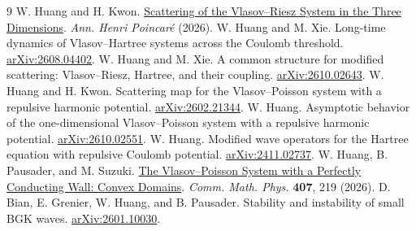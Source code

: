 \documentclass[reqno,10pt,letterpaper]{amsart}
\numberwithin{equation}{section}
\begin{document}
\begingroup
\small
\renewcommand{\refname}{References}
\begin{thebibliography}{9}
\setlength{\itemsep}{1pt}\setlength{\parskip}{0pt}\setlength{\parsep}{0pt}
 W. Huang and H. Kwon. \href{https://doi.org/10.1007/s00023-026-01735-7}{Scattering of the Vlasov--Riesz System in the Three Dimensions}. \emph{Ann. Henri Poincar\'e} (2026).
 W. Huang and M. Xie. Long-time dynamics of Vlasov--Hartree systems across the Coulomb threshold. \href{https://arxiv.org/abs/2608.04402}{arXiv:2608.04402}.
 W. Huang and M. Xie. A common structure for modified scattering: Vlasov--Riesz, Hartree, and their coupling. \href{https://arxiv.org/abs/2610.02643}{arXiv:2610.02643}.
 W. Huang and H. Kwon. Scattering map for the Vlasov--Poisson system with a repulsive harmonic potential. \href{https://arxiv.org/abs/2602.21344}{arXiv:2602.21344}.
 W. Huang. Asymptotic behavior of the one-dimensional Vlasov--Poisson system with a repulsive harmonic potential. \href{https://arxiv.org/abs/2610.02551}{arXiv:2610.02551}.
 W. Huang. Modified wave operators for the Hartree equation with repulsive Coulomb potential. \href{https://arxiv.org/abs/2411.02737}{arXiv:2411.02737}.
 W. Huang, B. Pausader, and M. Suzuki. \href{https://doi.org/10.1007/s00220-026-05731-0}{The Vlasov--Poisson System with a Perfectly Conducting Wall: Convex Domains}. \emph{Comm. Math. Phys.} \textbf{407}, 219 (2026).
 D. Bian, E. Grenier, W. Huang, and B. Pausader. Stability and instability of small BGK waves. \href{https://arxiv.org/abs/2601.10030}{arXiv:2601.10030}.
\end{thebibliography}
\endgroup
\end{document}
